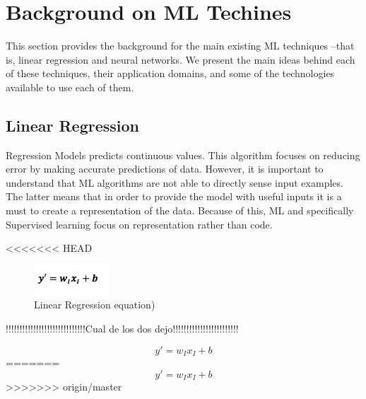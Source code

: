 

\section{Background on \acl{ML} Techines}
\label{sec:related}

This section provides the background for the main existing \ac{ML} techniques --that is, linear 
regression and neural networks. We present the main ideas behind each of these techniques, their 
application domains, and some of the technologies available to use each of them. 

\subsection{Linear Regression}

Regression Models predicts continuous values. This algorithm focuses on reducing error by making accurate predictions of data. However, it is important to understand that \ac{ML} algorithms are not able to directly sense input examples. The latter means that in order to provide the model with useful inputs it is a must to create a representation of the data. Because of this, \ac{ML} and specifically Supervised learning focus on representation rather than code. 

<<<<<<< HEAD
\begin{figure}[htbp]
  \centering
  \includegraphics[width=\textwidth]{images/regresion}
  \caption{Linear Regression equation)}
  \label{fig:regresion}
\end{figure}

!!!!!!!!!!!!!!!!!!!!!!!!!!!!!Cual de los dos dejo!!!!!!!!!!!!!!!!!!!!!!!!

\begin{equation} \label{eq:linearReg}
y'=w_I x_I+b
\end{equation}
=======
\[
y' = w_Ix_I + b
\]
>>>>>>> origin/master

